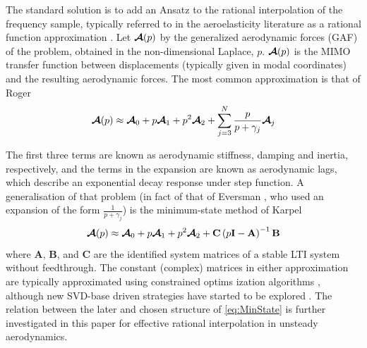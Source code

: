 \documentclass[11pt]{article}
\begin{document}
The standard solution is to add an Ansatz to the rational interpolation of the frequency sample, typically referred to in the aeroelasticity literature as a  rational function approximation \cite{Tifanny1988}. Let  $\boldsymbol{\mathcal{A}}(p)$ by the generalized aerodynamic forces (GAF) of the problem, obtained in the non-dimensional Laplace, \(p\). \(\boldsymbol{\mathcal{A}}(p)\) is the MIMO transfer function between displacements (typically given in modal coordinates) and the resulting aerodynamic forces. The most common approximation is that of Roger \cite{Roger1977}
\begin{equation}
 \boldsymbol{\mathcal{A}}(p)\approx\boldsymbol{\mathcal{A}}_0+p\boldsymbol{\mathcal{A}}_1+p^2\boldsymbol{\mathcal{A}}_2
        +\sum_{j=3}^{N}\frac{p}{p+\gamma_j}\boldsymbol{\mathcal{A}}_j
\end{equation}

The first three terms are known as aerodynamic stiffness, damping and inertia, respectively, and the terms in the expansion are known as aerodynamic lags, which describe an exponential decay response under step function. A generalisation of that problem (in fact of that of Eversman \cite{Eversman1991}, who used an expansion of the form \(\frac{1}{p+\gamma_j}\)) is the minimum-state method of Karpel \cite{Karpel1990}
\begin{equation}
\label{eq:MinState}
 \boldsymbol{\mathcal{A}}(p)\approx\boldsymbol{\mathcal{A}}_0+p\boldsymbol{\mathcal{A}}_1+p^2\boldsymbol{\mathcal{A}}_2
        +\textbf{C}\left(p\textbf{I}-\textbf{A}\right)^{-1}\textbf{B}
\end{equation}
where \(\textbf{A}\), \(\textbf{B}\), and \(\textbf{C}\) are the identified system matrices of a stable LTI system without feedthrough. The constant (complex) matrices in either approximation are typically approximated using constrained optims ization algorithms \cite{Tifanny1988}, although new SVD-base driven strategies have started to be explored \cite{Quero2019,Boncoraglio2021,Dawson2022}. The relation between the later and chosen structure of \eqref{eq:MinState} is further investigated in this paper for effective rational interpolation in unsteady aerodynamics.
\end{document}
